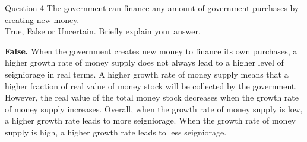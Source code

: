 \documentclass[a4paper]{article}
\newif\IfInSansMode
\numberwithin{equation}{section}
\numberwithin{figure}{section}
\begin{document}
	\begin{questionbox}{Question 4}
		The government can finance any amount of government purchases by creating new money.\\
		True, False or Uncertain. Briefly explain your answer.
		\begin{explanationbox}
			\textbf{False.} When the government creates new money to finance its own purchases, a higher growth rate of money supply does not always lead to a higher level of seigniorage in real terms. A higher growth rate of money supply means that a higher fraction of real value of money stock will be collected by the government. However, the real value of the total money stock decreases when the growth rate of money supply increases. Overall, when the growth rate of money supply is low, a higher growth rate leads to more seigniorage. When the growth rate of money supply is high, a higher growth rate leads to less seigniorage.
		\end{explanationbox}
	\end{questionbox}
\end{document}
